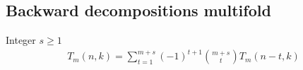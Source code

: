 \subsection{Backward decompositions multifold}\label{subsec:backward-decompositions-multifold}
\begin{proposition}
    \label{prop:Tm-recurrence-backward-multifold}
    Integer $s \geq 1$
    \begin{align*}
        T_{m} (n, k) = \sum_{t=1}^{m+s} (-1)^{t+1} \binom{m+s}{t} T_{m} (n-t, k)
    \end{align*}
\end{proposition}

